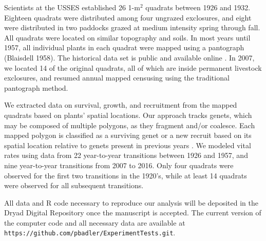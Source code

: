 \documentclass[11pt]{article}
\begin{document}
\begin{doublespacing}
Scientists at the USSES established 26 1-m$^2$ quadrats between 1926 and 1932. Eighteen quadrats were distributed among four ungrazed exclosures, and eight were distributed in two paddocks grazed at medium intensity spring through fall. All quadrats were located on similar topography and soils. In most years until 1957, all individual plants in each quadrat were mapped using a pantograph (Blaisdell 1958). The historical data set is public and available online \citep{zachmann_mapped_2010}. In 2007, we located 14 of the original quadrats, all of which are inside permanent livestock exclosures, and resumed annual mapped censusing using the traditional pantograph method. 

We extracted data on survival, growth, and recruitment from the mapped quadrats based on plants' spatial locations. Our approach tracks genets, which may be composed of multiple polygons, as they fragment and/or coalesce. Each mapped polygon is classified as a surviving genet or a new recruit based on its spatial location relative to genets present in previous years \citep{lauenroth_demography_2008}. We modeled vital rates using data from 22 year-to-year transitions between 1926 and 1957, and nine year-to-year transitions from 2007 to 2016. Only four quadrats were observed for the first two transitions in the 1920's, while at least 14 quadrats were observed for all subsequent transitions. 

All data and R code necessary to reproduce our analysis will be deposited in the Dryad Digital Repository once the manuscript is accepted. The current version of the computer code and all necessary data are available at \texttt{https://github.com/pbadler/ExperimentTests.git}.


\end{doublespacing}
\end{document}
